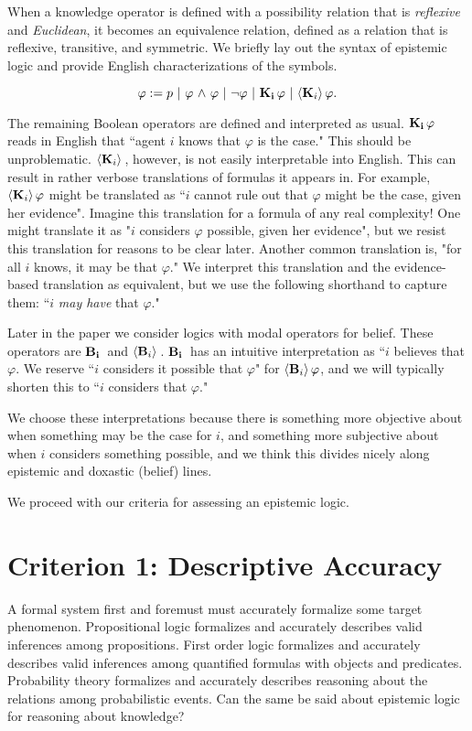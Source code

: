 When a knowledge operator is defined with a possibility relation that is \emph{reflexive} and \emph{Euclidean}, it becomes an equivalence relation, defined as a relation that is reflexive, transitive, and symmetric. We briefly lay out the syntax of epistemic logic and provide English characterizations of the symbols.

\begin{center}
$$\varphi := p\  |\  \varphi \tland \varphi\   |\ \tlnot \varphi \ |\   \Kns{i}\varphi\ |\ \Poss{i}\varphi. 
$$
\end{center}
The remaining Boolean operators are defined and interpreted as usual. $\mathbf{K}_{\mathbf{i}}\,\varphi$ reads in English that ``agent $i$ knows that $\varphi$ is the case." This should be unproblematic. $\langle \mathbf{K}_{i} \rangle\,$, however, is not easily interpretable into English. This can result in rather verbose translations of formulas it appears in. For example, $\langle \mathbf{K}_{i} \rangle\,\varphi$ might be translated as ``$i$ cannot rule out that $\varphi$ might be the case, given her evidence". Imagine this translation for a formula of any real complexity! One might translate it as "$i$ considers $\varphi$ possible, given her evidence", but we resist this translation for reasons to be clear later. Another common translation is, "for all $i$ knows, it may be that $\varphi$." We interpret this translation and the evidence-based translation as equivalent, but we use the following shorthand to capture them: ``$i$ \emph{may have} that $\varphi$."

Later in the paper we consider logics with modal operators for belief. These operators are $\mathbf{B}_{\mathbf{i}}\,$ and $\langle \mathbf{B}_{i} \rangle\,$. $\mathbf{B}_{\mathbf{i}}\,$ has an intuitive interpretation as ``$i$ believes that $\varphi$. We reserve ``$i$ considers it possible that $\varphi$" for $\langle \mathbf{B}_{i} \rangle\,\varphi$, and we will typically shorten this to ``$i$ considers that $\varphi$."

We choose these interpretations because there is something more objective about when something may be the case for $i$, and something more subjective about when $i$ considers something possible, and we think this divides nicely along epistemic and doxastic (belief) lines.

We proceed with our criteria for assessing an epistemic logic.

\section{Criterion 1: Descriptive Accuracy}
\label{sec:desc}
A formal system first and foremust must accurately formalize some target phenomenon. Propositional logic formalizes and accurately describes valid inferences among propositions. First order logic formalizes and accurately describes valid inferences among quantified formulas with objects and predicates. Probability theory formalizes and accurately describes reasoning about the relations among probabilistic events. Can the same be said about epistemic logic for reasoning about knowledge? 

